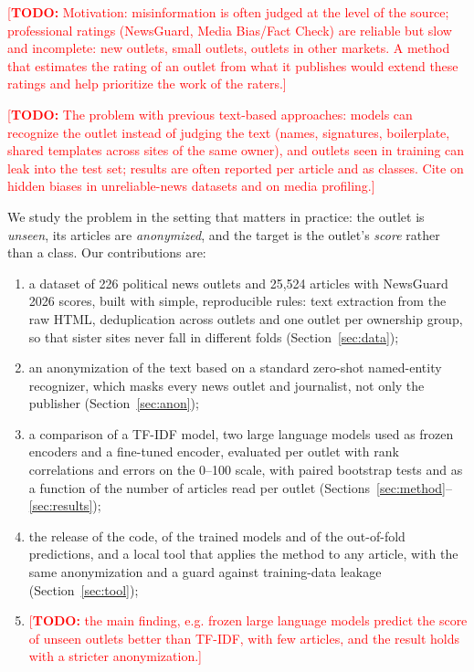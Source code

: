 \documentclass[11pt,a4paper]{article}
\newcommand{\todo}[1]{\textcolor{red}{[\textbf{TODO:} #1]}}
\begin{document}
\todo{Motivation: misinformation is often judged at the level of the source; professional ratings (NewsGuard, Media
Bias/Fact Check) are reliable but slow and incomplete: new outlets, small outlets, outlets in other markets. A method
that estimates the rating of an outlet from what it publishes would extend these ratings and help prioritize the work
of the raters.}

\todo{The problem with previous text-based approaches: models can recognize the outlet instead of judging the text
(names, signatures, boilerplate, shared templates across sites of the same owner), and outlets seen in training can
leak into the test set; results are often reported per article and as classes. Cite \citep{zhou2021hidden} on hidden
biases in unreliable-news datasets and \citep{baly2018predicting,baly2020written} on media profiling.}

We study the problem in the setting that matters in practice: the outlet is \emph{unseen}, its articles are
\emph{anonymized}, and the target is the outlet's \emph{score} rather than a class. Our contributions are:
\begin{enumerate}
  \item a dataset of 226 political news outlets and 25,524 articles with NewsGuard 2026 scores, built with simple,
        reproducible rules: text extraction from the raw HTML, deduplication across outlets and one outlet per
        ownership group, so that sister sites never fall in different folds (Section~\ref{sec:data});
  \item an anonymization of the text based on a standard zero-shot named-entity recognizer, which masks every news
        outlet and journalist, not only the publisher (Section~\ref{sec:anon});
  \item a comparison of a TF-IDF model, two large language models used as frozen encoders and a fine-tuned encoder,
        evaluated per outlet with rank correlations and errors on the 0--100 scale, with paired bootstrap tests and
        as a function of the number of articles read per outlet (Sections~\ref{sec:method}--\ref{sec:results});
  \item the release of the code, of the trained models and of the out-of-fold predictions, and a local tool that
        applies the method to any article, with the same anonymization and a guard against training-data leakage
        (Section~\ref{sec:tool});
  \item \todo{the main finding, e.g. frozen large language models predict the score of unseen outlets better than
        TF-IDF, with few articles, and the result holds with a stricter anonymization.}
\end{enumerate}
\end{document}
